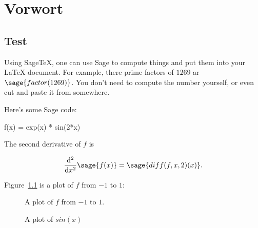 \chapter{Vorwort}
\section{Test}
Using Sage\TeX, one can use Sage to compute things and put them into
your \LaTeX{} document. For example, there prime factors of $1269$ ar $\sage{factor(1269)}$.
You don't need to compute the number yourself, or even cut and paste
it from somewhere.

Here's some Sage code:

\begin{sageblock}
    f(x) = exp(x) * sin(2*x)
\end{sageblock}

The second derivative of $f$ is

\[
  \frac{\mathrm{d}^{2}}{\mathrm{d}x^{2}} \sage{f(x)} =
  \sage{diff(f, x, 2)(x)}.
\]

Figure~\ref{fig:sage} is a plot of $f$ from $-1$ to $1$:
\begin{figure}[h]
\caption{A plot of $f$ from $-1$ to $1$.}
\centering
\label{fig:sage}
\end{figure}

\begin{figure}
\caption{A plot of $sin(x)$}
\centering
\label{fig:sin}
\end{figure}

